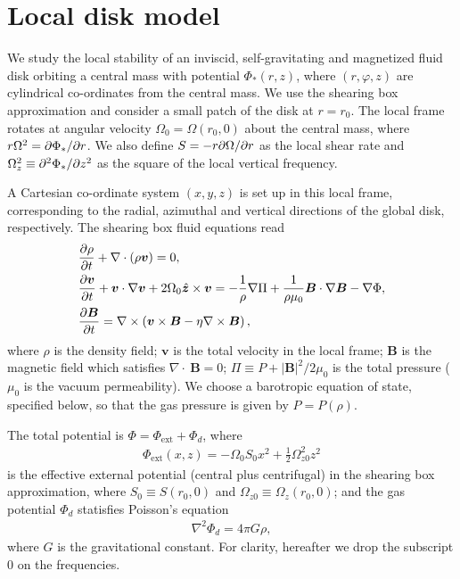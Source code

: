 \section{Local disk model}
We study the local stability of an inviscid, self-gravitating and
magnetized fluid disk orbiting a central mass with
potential $\Phi_*(r,z)$, where $(r,\varphi,z)$ are cylindrical
co-ordinates from the central mass. We use the shearing box approximation     
\citep{goldreich65b} and consider a small patch of the disk at
$r=r_0$. The local frame rotates at angular velocity 
$\Omega_0=\Omega(r_0,0)$ about the central mass, where $r\Omega^2 =
\partial\Phi_*/\partial r$. We also define $S=-r\partial\Omega/\partial r$ as the local shear
rate and $\Omega_z^2\equiv\partial^2\Phi_*/\partial z^2$ as the square of the
local vertical frequency. 

A Cartesian co-ordinate system $(x,y,z)$ is set
up in this local frame, corresponding to the radial, azimuthal and vertical
directions of the global disk, respectively. The shearing box fluid
equations read 
\begin{align} 
  &\frac{\partial\rho}{\partial t}+\nabla\cdot(\rho\bm{v}) = 0,\\
  &\frac{\partial \bm{v}}{\partial t} + \bm{v}\cdot\nabla\bm{v} +
  2\Omega_0\hat{\bm{z}}\times\bm{v} = - \frac{1}{\rho}\nabla\Pi +
  \frac{1}{\rho\mu_0}\bm{B}\cdot\nabla\bm{B}
  -\nabla\Phi,\\
  &\frac{\partial\bm{B}}{\partial t}= \nabla\times\left(\bm{v}\times\bm{B} -
  \eta\nabla\times\bm{B}\right), 
\end{align}
where $\rho$ is the density field; $\bm{v}$ is the total velocity in
the local frame; $\bm{B}$ is the magnetic field which satisfies
$\nabla\cdot~\bm{B}=0$; $\Pi \equiv P +
|\bm{B}|^2/2\mu_0$ is the total pressure ($\mu_0$ is the vacuum
permeability). We choose a barotropic equation of state, specified
below, so that the gas pressure is given by $P=P(\rho)$. 

The total potential is $\Phi = \Phi_\mathrm{ext} + \Phi_d$, where
\begin{align}
  \Phi_\mathrm{ext}(x,z) = -\Omega_0 S_0 x^2 +
  \frac{1}{2}\Omega_{z0}^2z^2 
\end{align}
is the effective external potential (central plus centrifugal) in the
shearing box approximation, where $S_0\equiv S(r_0,0)$ and
$\Omega_{z0}\equiv\Omega_z(r_0,0)$; 
and the gas potential $\Phi_d$ statisfies Poisson's equation
\begin{align}
  \nabla^2\Phi_d = 4\pi G \rho, 
\end{align}
where $G$ is the gravitational constant. For clarity, hereafter we
drop the subscript $0$ on the frequencies. 

